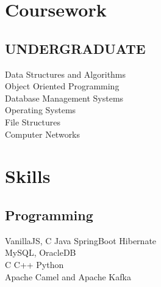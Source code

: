 \documentclass[]{deedy-resume-openfont}
\begin{document}
\begin{minipage}[t]{0.33\textwidth}

\section{Coursework}
\subsection{UNDERGRADUATE}
Data Structures and Algorithms\\
Object Oriented Programming\\
Database Management Systems\\
Operating Systems\\
File Structures\\
Computer Networks\\
\sectionsep


\section{Skills}
\subsection{Programming}
VanillaJS, \textbullet{} C \textbullet{} Java \textbullet{} SpringBoot \textbullet{} 
Hibernate \\
\textbullet{} MySQL, OracleDB\\ 
\textbullet{} C \textbullet{} C++ \textbullet{} Python\\
\textbullet{} Apache Camel and Apache Kafka
\sectionsep

%
%

\end{minipage} 
\hfill
\end{document}
